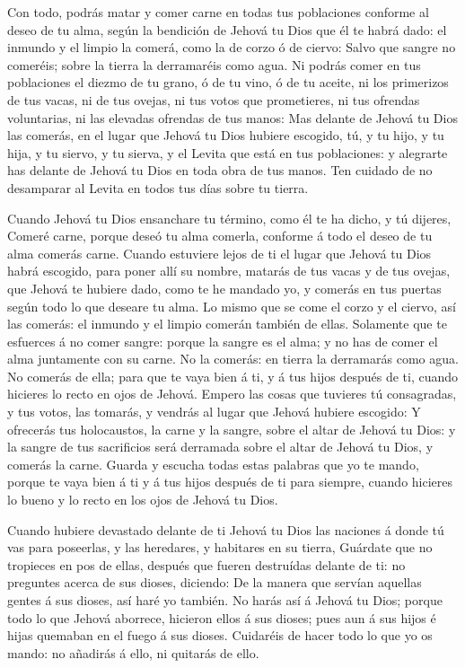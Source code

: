  Con todo, podrás matar y comer carne en todas tus
poblaciones conforme al deseo de tu alma, según la bendición de Jehová
tu Dios que él te habrá dado: el inmundo y el limpio la comerá, como la
de corzo ó de ciervo:  Salvo que sangre no comeréis; sobre
la tierra la derramaréis como agua.  Ni podrás comer en tus
poblaciones el diezmo de tu grano, ó de tu vino, ó de tu aceite, ni los
primerizos de tus vacas, ni de tus ovejas, ni tus votos que prometieres,
ni tus ofrendas voluntarias, ni las elevadas ofrendas de tus manos:
 Mas delante de Jehová tu Dios las comerás, en el lugar que
Jehová tu Dios hubiere escogido, tú, y tu hijo, y tu hija, y tu siervo,
y tu sierva, y el Levita que está en tus poblaciones: y alegrarte has
delante de Jehová tu Dios en toda obra de tus manos.  Ten
cuidado de no desamparar al Levita en todos tus días sobre tu tierra.

 Cuando Jehová tu Dios ensanchare tu término, como él te ha
dicho, y tú dijeres, Comeré carne, porque deseó tu alma comerla,
conforme á todo el deseo de tu alma comerás carne.  Cuando
estuviere lejos de ti el lugar que Jehová tu Dios habrá escogido, para
poner allí su nombre, matarás de tus vacas y de tus ovejas, que Jehová
te hubiere dado, como te he mandado yo, y comerás en tus puertas según
todo lo que deseare tu alma.  Lo mismo que se come el corzo
y el ciervo, así las comerás: el inmundo y el limpio comerán también de
ellas.  Solamente que te esfuerces á no comer sangre:
porque la sangre es el alma; y no has de comer el alma juntamente con su
carne.  No la comerás: en tierra la derramarás como agua.
 No comerás de ella; para que te vaya bien á ti, y á tus
hijos después de ti, cuando hicieres lo recto en ojos de Jehová.
 Empero las cosas que tuvieres tú consagradas, y tus votos,
las tomarás, y vendrás al lugar que Jehová hubiere escogido:
 Y ofrecerás tus holocaustos, la carne y la sangre, sobre
el altar de Jehová tu Dios: y la sangre de tus sacrificios será
derramada sobre el altar de Jehová tu Dios, y comerás la carne.
 Guarda y escucha todas estas palabras que yo te mando,
porque te vaya bien á ti y á tus hijos después de ti para siempre,
cuando hicieres lo bueno y lo recto en los ojos de Jehová tu Dios.

 Cuando hubiere devastado delante de ti Jehová tu Dios las
naciones á donde tú vas para poseerlas, y las heredares, y habitares en
su tierra,  Guárdate que no tropieces en pos de ellas,
después que fueren destruídas delante de ti: no preguntes acerca de sus
dioses, diciendo: De la manera que servían aquellas gentes á sus dioses,
así haré yo también.  No harás así á Jehová tu Dios; porque
todo lo que Jehová aborrece, hicieron ellos á sus dioses; pues aun á sus
hijos é hijas quemaban en el fuego á sus dioses.  Cuidaréis
de hacer todo lo que yo os mando: no añadirás á ello, ni quitarás de
ello.

